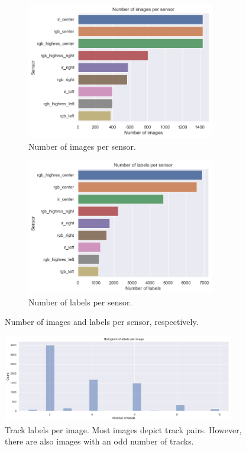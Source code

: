 \documentclass[Master,MDS,english]{BASE/twbook} %
\begin{document}
\begin{figure}[H]
\centering
\begin{subfigure}[t]{.5\textwidth}
  \centering
  \includegraphics[width=0.9\textwidth]{images/datasets/db/images_per_sensor}
  \caption{Number of images per sensor.}
\end{subfigure}%
\begin{subfigure}[t]{.5\textwidth}
  \centering
  \includegraphics[width=0.9\textwidth]{images/datasets/db/labels_per_sensor}
  \caption{Number of labels per sensor.}
\end{subfigure}
\caption{Number of images and labels per sensor, respectively.}
\label{fig:number_images}
\end{figure}


\begin{figure}[H]
\centering
\includegraphics[width=0.9\textwidth]{images/datasets/db/labels_per_image}
\caption{Track labels per image. Most images depict track pairs. However, there are also images with an odd number of tracks. }
\label{fig:labels_per_image}
\end{figure}
\end{document}
